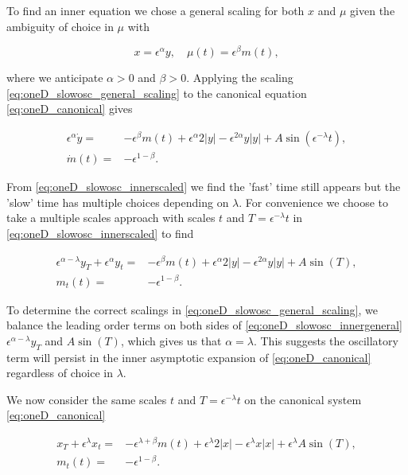 To find an inner equation we chose a general scaling for both $x$ and $\mu$ given the ambiguity of choice in $\mu$ with

\begin{equation}\label{eq:oneD_slowosc_general_scaling}
x=\epsilon^\alpha y ,\quad \mu(t)=\epsilon^\beta m(t),
\end{equation}

where we anticipate $\alpha>0$ and $\beta>0$. Applying the scaling \eqref{eq:oneD_slowosc_general_scaling} to the canonical equation \eqref{eq:oneD_canonical} gives

\begin{equation}\label{eq:oneD_slowosc_innerscaled}
\begin{aligned}
\epsilon^\alpha \dot{y}=& -\epsilon^\beta m(t)+\epsilon^\alpha 2|y| - \epsilon^{2\alpha}y|y| +A\sin(\epsilon^{-\lambda}t),\\
\dot{m}(t)=&-\epsilon^{1-\beta}.
\end{aligned}
\end{equation}

From \eqref{eq:oneD_slowosc_innerscaled} we find the 'fast' time still appears but the 'slow' time has multiple choices depending on $\lambda$. For convenience we choose to take a multiple scales approach with scales $t$ and $T=\epsilon^{-\lambda}t$ in \eqref{eq:oneD_slowosc_innerscaled} to find

\begin{equation}\label{eq:oneD_slowosc_innergeneral}
\begin{aligned}
\epsilon^{\alpha-\lambda} y_T+\epsilon^{\alpha}y_t=& -\epsilon^{\beta}m(t)+\epsilon^{\alpha}2|y|-\epsilon^{2\alpha}y|y|+A\sin(T),\\
m_t(t)=&-\epsilon^{1-\beta}.
\end{aligned}
\end{equation}

To determine the correct scalings in \eqref{eq:oneD_slowosc_general_scaling}, we balance the leading order terms on both sides of \eqref{eq:oneD_slowosc_innergeneral} $\epsilon^{\alpha-\lambda}y_T$ and $A\sin(T)$, which gives us that $\alpha=\lambda$. This suggests the oscillatory term will persist in the inner asymptotic expansion of \eqref{eq:oneD_canonical} regardless of choice in $\lambda$.

We now consider the same scales $t$ and $T=\epsilon^{-\lambda}t$ on the canonical system \eqref{eq:oneD_canonical} 

\begin{equation}\label{eq:oneD_slowosc_general_outermulti}
\begin{aligned}
x_T+\epsilon^{\lambda}x_t =& -\epsilon^{\lambda+\beta}m(t)+\epsilon^{\lambda}2|x|-\epsilon^{\lambda}x|x|+\epsilon^{\lambda}A\sin(T),\\
m_t(t) =&-\epsilon^{1-\beta}.
\end{aligned}
\end{equation}

